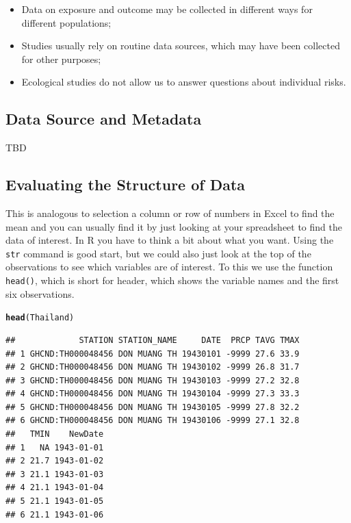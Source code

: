 \documentclass{article}\usepackage[]{graphicx}\usepackage[]{color}
\makeatletter
\newcommand{\hlstd}[1]{\textcolor[rgb]{0.345,0.345,0.345}{#1}}%
\newcommand{\hlkwd}[1]{\textcolor[rgb]{0.737,0.353,0.396}{\textbf{#1}}}%
\newenvironment{kframe}{%
 \def\at@end@of@kframe{}%
 \ifinner\ifhmode%
  \def\at@end@of@kframe{\end{minipage}}%
  \begin{minipage}{\columnwidth}%
 \fi\fi%
 \def\FrameCommand##1{\hskip\@totalleftmargin \hskip-\fboxsep
 \colorbox{shadecolor}{##1}\hskip-\fboxsep
     \hskip-\linewidth \hskip-\@totalleftmargin \hskip\columnwidth}%
 \MakeFramed {\advance\hsize-\width
   \@totalleftmargin\z@ \linewidth\hsize
   \@setminipage}}%
 {\par\unskip\endMakeFramed%
 \at@end@of@kframe}
\newenvironment{knitrout}{}{} %
\makeatother
\begin{document}
\begin{itemize}
  \item Data on exposure and outcome may be collected in different ways for different populations;
  \item Studies usually rely on routine data sources, which may have been collected for other purposes;
  \item Ecological studies do not allow us to answer questions about individual risks.
\end{itemize}

\subsection{Data Source and Metadata}

TBD

\subsection{Evaluating the Structure of Data}



This is analogous to selection a column or row of numbers in Excel to find the mean and you can usually find it by just looking at your spreadsheet to find the data of interest. In R you have to think a bit about what you want. Using the \texttt{str} command is good start, but we could also just look at the top of the observations to see which variables are of interest. To this we use the function \texttt{head()}, which is short for header, which shows the variable names and the first six observations.

\begin{knitrout}
\color{fgcolor}\begin{kframe}
\begin{alltt}
\hlkwd{head}\hlstd{(Thailand)}
\end{alltt}
\begin{verbatim}
##             STATION STATION_NAME     DATE  PRCP TAVG TMAX
## 1 GHCND:TH000048456 DON MUANG TH 19430101 -9999 27.6 33.9
## 2 GHCND:TH000048456 DON MUANG TH 19430102 -9999 26.8 31.7
## 3 GHCND:TH000048456 DON MUANG TH 19430103 -9999 27.2 32.8
## 4 GHCND:TH000048456 DON MUANG TH 19430104 -9999 27.3 33.3
## 5 GHCND:TH000048456 DON MUANG TH 19430105 -9999 27.8 32.2
## 6 GHCND:TH000048456 DON MUANG TH 19430106 -9999 27.1 32.8
##   TMIN    NewDate
## 1   NA 1943-01-01
## 2 21.7 1943-01-02
## 3 21.1 1943-01-03
## 4 21.1 1943-01-04
## 5 21.1 1943-01-05
## 6 21.1 1943-01-06
\end{verbatim}
\end{kframe}
\end{knitrout}
\end{document}
